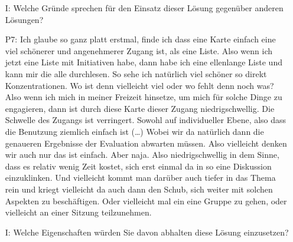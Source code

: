 \begin{itemize}
Erkenntnisgewinn entwickeln. (\dots) Achso, und was mir gerade noch einf{\"a}llt. Auf den konkreten Tag bezogen, da ist die Karte nat{\"u}rlich auch sehr sch{\"o}n, um Aktionen die nur an dem Tag stattfinden hervorzuheben. Vielleicht dass man da noch eine weitere Farbe einf{\"u}gt f{\"u}r Aktionen an dem Tag. Weil die Idee ist ja auch an dem Tag, dass dieser nicht nur zentral organisiert wird, sondern auch da ist die Idee, dass die B{\"u}rger direkt partizipieren und selbst Aktionen anbieten. Oft l{\"a}uft das ja {\"u}ber so eine nachbarschaftliche Verbindung, dass da sich Beispielsweise in einem Hinterhof irgendwer etwas {\"u}berlegt hat. Und das sollen die dann da auch in die Karte mit eintragen. Das w{\"a}re dann ja eine M{\"o}glichkeit f{\"u}r die B{\"u}rger diesen Tag, oder den Ablauf des Tages, dezentral zu planen. Das ist auch so eine Sache, die ich mir da f{\"u}r den konkreten Tag verspreche. Das f{\"a}nde ich auch eine gute Funktion.
    \item[I:] Welche Gr{\"u}nde sprechen f{\"u}r den Einsatz dieser L{\"o}sung gegen{\"u}ber anderen L{\"o}sungen?
    \item[P7:] Ich glaube so ganz platt erstmal, finde ich dass eine Karte einfach eine viel sch{\"o}nerer und angenehmerer Zugang ist, als eine Liste. Also wenn ich jetzt eine Liste mit Initiativen habe, dann habe ich eine ellenlange Liste und kann mir die alle durchlesen. So sehe ich nat{\"u}rlich viel sch{\"o}ner so direkt Konzentrationen. Wo ist denn vielleicht viel oder wo fehlt denn noch was? Also wenn ich mich in meiner Freizeit hinsetze, um mich f{\"u}r solche Dinge zu engagieren, dann ist durch diese Karte dieser Zugang niedrigschwellig. Die Schwelle des Zugangs ist verringert. Sowohl auf individueller Ebene, also dass die Benutzung ziemlich einfach ist (\dots) Wobei wir da nat{\"u}rlich dann die genaueren Ergebnisse der Evaluation abwarten m{\"u}ssen. Also vielleicht denken wir auch nur das ist einfach. Aber naja. Also niedrigschwellig in dem Sinne, dass es relativ wenig Zeit kostet, sich erst einmal da in so eine Diskussion einzuklinken. Und vielleicht kommt man dar{\"u}ber auch tiefer in das Thema rein und kriegt vielleicht da auch dann den Schub, sich weiter mit solchen Aspekten zu besch{\"a}ftigen. Oder vielleicht mal ein eine Gruppe zu gehen, oder vielleicht an einer Sitzung teilzunehmen.
    \item[I:] Welche Eigenschaften w{\"u}rden Sie davon abhalten diese L{\"o}sung einzusetzen?

\end{itemize}

